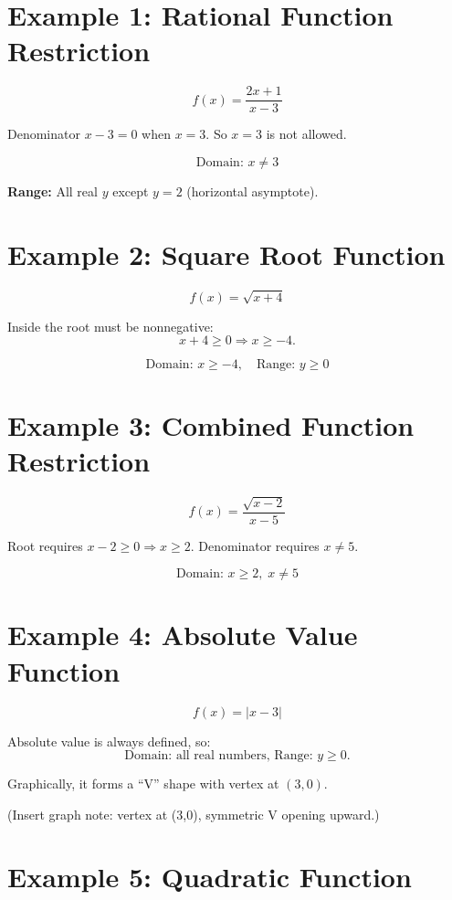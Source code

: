 \documentclass[12pt]{article}
\begin{document}
\section*{Example 1: Rational Function Restriction}

\[
f(x) = \frac{2x + 1}{x - 3}
\]

Denominator \(x - 3 = 0\) when \(x = 3.\)  
So \(x = 3\) is not allowed.

\[
\boxed{\text{Domain: } x \neq 3}
\]

\textbf{Range:} All real \(y\) except \(y = 2\) (horizontal asymptote).

\section*{Example 2: Square Root Function}

\[
f(x) = \sqrt{x + 4}
\]

Inside the root must be nonnegative:
\[
x + 4 \ge 0 \Rightarrow x \ge -4.
\]

\[
\boxed{\text{Domain: } x \ge -4, \quad \text{Range: } y \ge 0}
\]

\section*{Example 3: Combined Function Restriction}

\[
f(x) = \frac{\sqrt{x - 2}}{x - 5}
\]

Root requires \(x - 2 \ge 0 \Rightarrow x \ge 2\).  
Denominator requires \(x \neq 5\).

\[
\boxed{\text{Domain: } x \ge 2, \; x \neq 5}
\]

\section*{Example 4: Absolute Value Function}

\[
f(x) = |x - 3|
\]

Absolute value is always defined, so:
\[
\boxed{\text{Domain: all real numbers, Range: } y \ge 0.}
\]

Graphically, it forms a “V” shape with vertex at \((3,0)\).

(Insert graph note: vertex at (3,0), symmetric V opening upward.)

\section*{Example 5: Quadratic Function}
\end{document}

